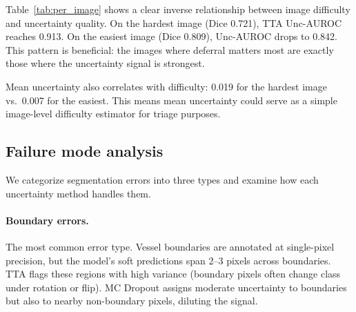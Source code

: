 \begin{table}[H]
\centering
\caption{Per-image Dice and Unc-AUROC for 5 representative DRIVE test
images, ranked by difficulty (ascending Dice). Hard images (low Dice)
tend to have higher Unc-AUROC, consistent with the cross-dataset finding
that uncertainty quality improves when the model makes more errors.}
\label{tab:per_image}
\small
\setlength{\tabcolsep}{4.6pt}
\end{table}

Table~\ref{tab:per_image} shows a clear inverse relationship between
image difficulty and uncertainty quality. On the hardest image (Dice 0.721),
TTA Unc-AUROC reaches 0.913. On the easiest image (Dice 0.809),
Unc-AUROC drops to 0.842. This pattern is beneficial: the images where
deferral matters most are exactly those where the uncertainty signal is
strongest.

Mean uncertainty also correlates with difficulty: 0.019 for the hardest
image vs.\ 0.007 for the easiest. This means mean uncertainty could serve
as a simple image-level difficulty estimator for triage purposes.

\subsection{Failure mode analysis}

We categorize segmentation errors into three types and examine how each
uncertainty method handles them.

\paragraph{Boundary errors.} The most common error type. Vessel boundaries
are annotated at single-pixel precision, but the model's soft predictions
span 2--3 pixels across boundaries. TTA flags these regions with high
variance (boundary pixels often change class under rotation or flip). MC
Dropout assigns moderate uncertainty to boundaries but also to nearby
non-boundary pixels, diluting the signal.

